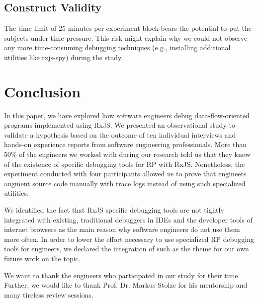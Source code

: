\documentclass[sigplan,screen,review]{acmart}
\begin{document}
\subsection{Construct Validity}

The time limit of 25 minutes per experiment block bears the potential to put the subjects under time pressure. This risk might explain why we could not observe any more time-consuming debugging techniques (e.g., installing additional utilities like rxjs-spy) during the study.


\section{Conclusion}
\label{sec:conclusion}

In this paper, we have explored how software engineers debug data-flow-oriented programs implemented using RxJS. We presented an observational study to validate a hypothesis based on the outcome of ten individual interviews and hands-on experience reports from software engineering professionals. More than 50\% of the engineers we worked with during our research told us that they know of the existence of specific debugging tools for RP with RxJS. Nonetheless, the experiment conducted with four participants allowed us to prove that engineers augment source code manually with trace logs instead of using such specialized utilities.

We identified the fact that RxJS specific debugging tools are not tightly integrated with existing, traditional debuggers in IDEs and the developer tools of internet browsers as the main reason why software engineers do not use them more often. In order to lower the effort necessary to use specialized RP debugging tools for engineers, we declared the integration of such as the theme for our own future work on the topic.

\begin{acks}
	We want to thank the engineers who participated in our study for their time. Further, we would like to thank Prof. Dr. Markus Stolze for his mentorship and many tireless review sessions.
\end{acks}



\end{document}
